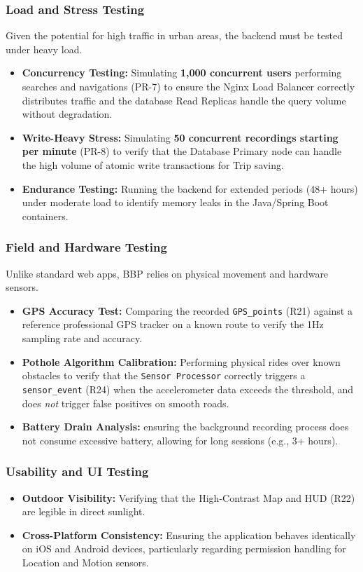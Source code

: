\subsubsection{Load and Stress Testing}
Given the potential for high traffic in urban areas, the backend must be tested under heavy load.
\begin{itemize}
    \item \textbf{Concurrency Testing:} Simulating \textbf{1,000 concurrent users} performing searches and navigations (PR-7) to ensure the Nginx Load Balancer correctly distributes traffic and the database Read Replicas handle the query volume without degradation.
    \item \textbf{Write-Heavy Stress:} Simulating \textbf{50 concurrent recordings starting per minute} (PR-8) to verify that the Database Primary node can handle the high volume of atomic write transactions for Trip saving.
    \item \textbf{Endurance Testing:} Running the backend for extended periods (48+ hours) under moderate load to identify memory leaks in the Java/Spring Boot containers.
\end{itemize}

\subsubsection{Field and Hardware Testing}
Unlike standard web apps, BBP relies on physical movement and hardware sensors.
\begin{itemize}
    \item \textbf{GPS Accuracy Test:} Comparing the recorded \texttt{GPS\_points} (R21) against a reference professional GPS tracker on a known route to verify the 1Hz sampling rate and accuracy.
    \item \textbf{Pothole Algorithm Calibration:} Performing physical rides over known obstacles to verify that the \texttt{Sensor Processor} correctly triggers a \texttt{sensor\_event} (R24) when the accelerometer data exceeds the threshold, and does \textit{not} trigger false positives on smooth roads.
    \item \textbf{Battery Drain Analysis:} ensuring the background recording process does not consume excessive battery, allowing for long sessions (e.g., 3+ hours).
\end{itemize}

\subsubsection{Usability and UI Testing}
\begin{itemize}
    \item \textbf{Outdoor Visibility:} Verifying that the High-Contrast Map and HUD (R22) are legible in direct sunlight.
    \item \textbf{Cross-Platform Consistency:} Ensuring the application behaves identically on iOS and Android devices, particularly regarding permission handling for Location and Motion sensors.
\end{itemize}